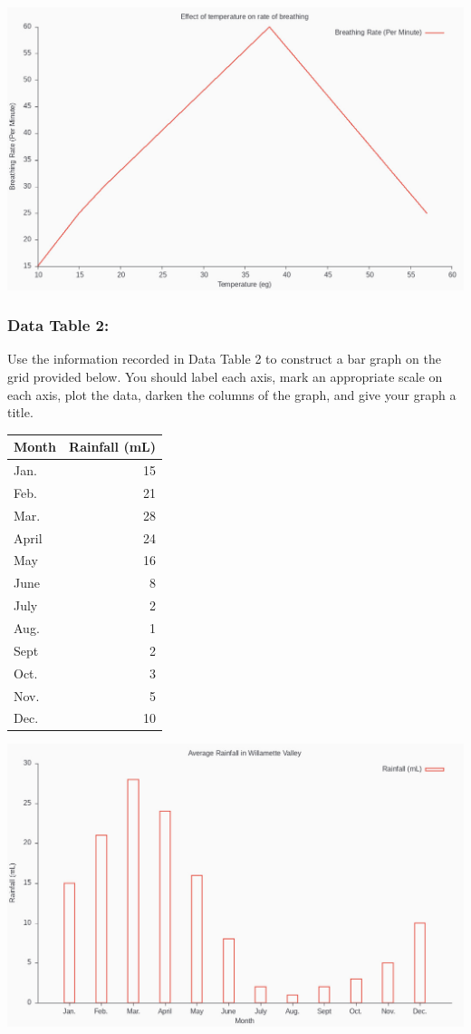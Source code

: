 \documentclass{scrartcl}
\begin{document}
\begin{center}
\includegraphics[width=.9\linewidth]{./temperatureVSbreathing.jpeg}
\end{center}

\subsubsection{Data Table 2:}
\label{sec:org95e81b0}
Use the information recorded in Data Table 2 to construct a bar graph
on the grid provided below. You should label each axis, mark an appropriate
scale on each axis, plot the data, darken the columns of the graph, and give
your graph a title.

\begin{center}
\begin{tabular}{lr}
\toprule
Month & Rainfall (mL)\\
\midrule
Jan. & 15\\
Feb. & 21\\
Mar. & 28\\
April & 24\\
May & 16\\
June & 8\\
July & 2\\
Aug. & 1\\
Sept & 2\\
Oct. & 3\\
Nov. & 5\\
Dec. & 10\\
\bottomrule
\end{tabular}
\end{center}

\begin{center}
\includegraphics[width=.9\linewidth]{./averagerainfall.jpeg}
\end{center}
\end{document}
